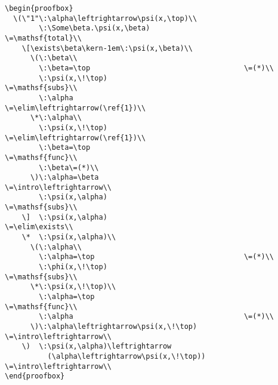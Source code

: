 \documentclass{article}
\def\intro#1{{#1}{\cal I}}
\def\elim#1{{#1}{\cal E}}
\def\elim#1{{{#1}{\cal E}}}
\def\intro#1{{{#1}{\cal I}}}
\begin{document}
\begin{verbatim}
\begin{proofbox}
  \(\"1"\:\alpha\leftrightarrow\psi(x,\top)\\
        \:\Some\beta.\psi(x,\beta)                      \=\mathsf{total}\\
    \[\exists\beta\kern-1em\:\psi(x,\beta)\\
      \(\:\beta\\
        \:\beta=\top                                    \=(*)\\
        \:\psi(x,\!\top)                                \=\mathsf{subs}\\
        \:\alpha                         \=\elim\leftrightarrow(\ref{1})\\
      \*\:\alpha\\
        \:\psi(x,\!\top)                 \=\elim\leftrightarrow(\ref{1})\\
        \:\beta=\top                                     \=\mathsf{func}\\
        \:\beta\=(*)\\
      \)\:\alpha=\beta                           \=\intro\leftrightarrow\\
        \:\psi(x,\alpha)                                 \=\mathsf{subs}\\
    \]  \:\psi(x,\alpha)                                  \=\elim\exists\\
    \*  \:\psi(x,\alpha)\\
      \(\:\alpha\\
        \:\alpha=\top                                   \=(*)\\
        \:\phi(x,\!\top)                                \=\mathsf{subs}\\
      \*\:\psi(x,\!\top)\\
        \:\alpha=\top                                   \=\mathsf{func}\\
        \:\alpha                                        \=(*)\\
      \)\:\alpha\leftrightarrow\psi(x,\!\top)   \=\intro\leftrightarrow\\
    \)  \:\psi(x,\alpha)\leftrightarrow
          (\alpha\leftrightarrow\psi(x,\!\top)) \=\intro\leftrightarrow\\
\end{proofbox}
\end{verbatim}
\end{document}
